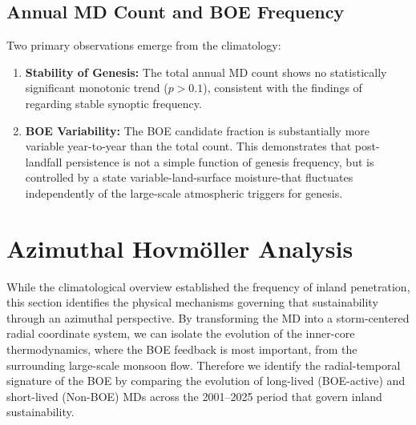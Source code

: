 \subsection{Annual MD Count and BOE Frequency}
\label{subsec:multiyear_count}


Two primary observations emerge from the climatology:
\begin{enumerate}
  \item \textbf{Stability of Genesis:} The total annual MD count
    shows no statistically significant monotonic trend ($p > 0.1$),
    consistent with the findings of \autocite{mishra2021monsoon}
    regarding stable synoptic frequency.
  \item \textbf{BOE Variability:} The BOE candidate fraction is
    substantially more variable year-to-year than the total count.
    This demonstrates that post-landfall persistence is not a simple
    function of genesis frequency, but is controlled by a state
    variable-land-surface moisture-that fluctuates independently of
    the large-scale atmospheric triggers for genesis.
\end{enumerate}


\section{Azimuthal Hovm\texorpdfstring{\"{o}}{o}ller Analysis}
\label{sec:results_hovmoller}

While the climatological overview established the frequency of inland
penetration, this section identifies the physical mechanisms governing
that sustainability through an azimuthal perspective. By transforming the
MD into a storm-centered radial coordinate system, we can isolate the
evolution of the inner-core thermodynamics, where the BOE feedback is most
important, from the surrounding large-scale monsoon flow. Therefore we
identify the radial-temporal signature of the BOE by comparing the evolution
of long-lived (BOE-active) and short-lived (Non-BOE) MDs across the 2001–2025
period that govern inland sustainability. %

